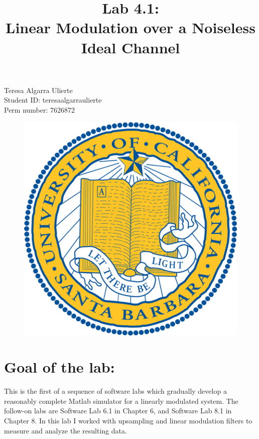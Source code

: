 \documentclass[a4paper,11pt]{article}
\title{\bfseries Lab 4.1: \\ Linear Modulation over a Noiseless Ideal Channel\\}
\date{}
\begin{document}
\renewcommand\contentsname{\vspace{-1cm}}
\maketitle
\lstset{language=Matlab}

\begin{centering}
    Teresa Algarra Ulierte \\
    Student ID: teresaalgarraulierte \\
    Perm number: 7626872 \\
\end{centering}

\vspace{3cm}

\begin{figure}[!ht]
	\centering
	\includegraphics[scale = 5]{images/portada.jpeg}
\end{figure}

\newpage

\section{Goal of the lab:}

This is the first of a sequence of software labs which gradually develop a
reasonably complete Matlab simulator for a linearly modulated system. The
follow-on labs are Software Lab 6.1 in Chapter 6, and Software Lab 8.1 in
Chapter 8. In this lab I worked with upsampling and linear modulation filters to
measure and analyze the resulting data.
\end{document}
